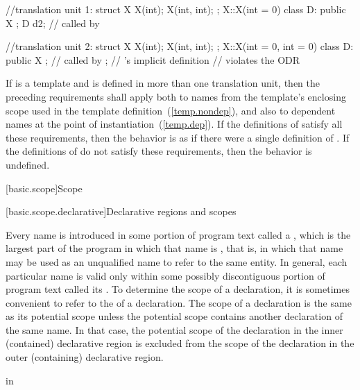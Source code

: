 \begin{itemize}
\begin{codeblock}
//translation unit 1:
struct X {
  X(int);
  X(int, int);
};
X::X(int = 0) { }
class D: public X { };
D d2;                           //  called by 

//translation unit 2:
struct X {
  X(int);
  X(int, int);
};
X::X(int = 0, int = 0) { }
class D: public X { };          //  called by ;
                                // 's implicit definition
                                // violates the ODR
\end{codeblock}
\exitexample
\end{itemize}

If  is a template and is defined in more than one
translation unit, then the preceding requirements
shall apply both to names from the template's enclosing scope used in the
template definition~(\ref{temp.nondep}), and also to dependent names at
the point of instantiation~(\ref{temp.dep}). If the definitions of
 satisfy all these requirements, then the behavior is
as if there were a single definition of . If the definitions of
 do not satisfy these requirements, then the behavior is
undefined.%

[basic.scope]{Scope}%

[basic.scope.declarative]{Declarative regions and scopes}%

\pnum
{}%
Every name is introduced in some portion of program text called a
%
%
, which is the largest part of the program
in which that name is , that is, in which that name may
be used as an unqualified name to refer to the same entity. In general,
each particular name is valid only within some possibly discontiguous
portion of program text called its . To determine the
scope of a declaration, it is sometimes convenient to refer to the
 of a declaration. The scope of a declaration
is the same as its potential scope unless the potential scope contains
another declaration of the same name. In that case, the potential scope
of the declaration in the inner (contained) declarative region is
excluded from the scope of the declaration in the outer (containing)
declarative region.

\pnum
\enterexample
in

